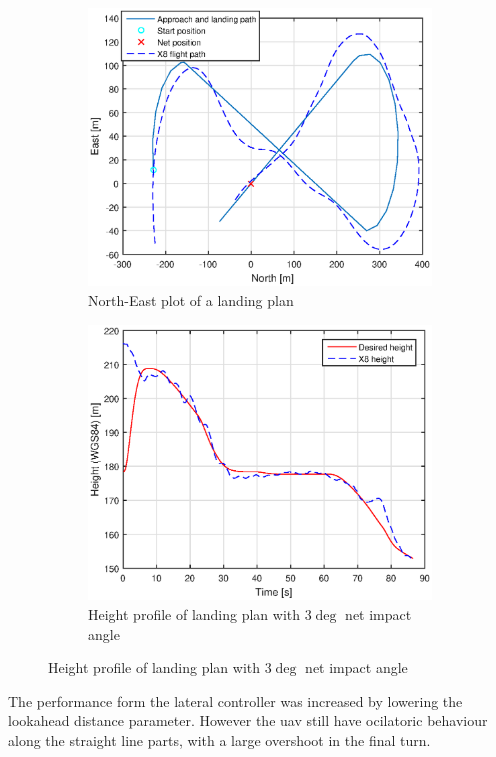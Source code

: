 \begin{figure}[H]
\begin{subfigure}[H]{1\textwidth}
	\centering
		\includegraphics[width=1\textwidth]{figs/Experiment/NorthEast31mai103029.eps}
		\caption{North-East plot of a landing plan}
		\label{Fig:NorthEast31mai103029}
\end{subfigure}
\begin{subfigure}[H]{1\textwidth}
		\includegraphics[width=1\textwidth]{figs/Experiment/Height31mai103029.eps}
		\caption{Height profile of landing plan with $3 \deg$ net impact angle}
		\label{Fig:Height31mai103029}
\end{subfigure}
\end{figure}
The performance form the lateral controller was increased by lowering the lookahead distance parameter. However the \gls{uav} still have ocilatoric behaviour along the straight line parts, with a large overshoot in the final turn.


